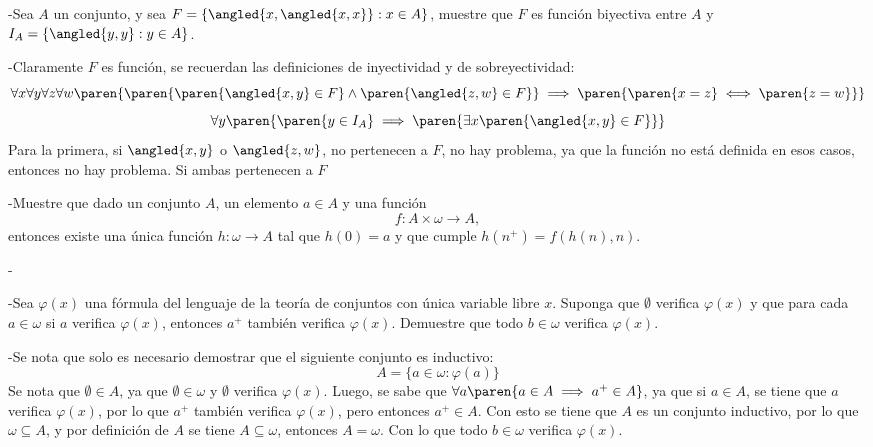 \begin{prob}
    -Sea \(A\) un conjunto, y sea \(F=\{\angled{x,\angled{x,x}}:x\in A\}\), muestre que \(F\) es función biyectiva entre \(A\) y \(I_A=\{\angled{y,y}:y\in A\}\).
\end{prob}

\begin{sol}
    -Claramente \(F\) es función, se recuerdan las definiciones de inyectividad y de sobreyectividad:
    \[
        \forall x\forall y\forall z\forall w\paren{\paren{\paren{\angled{x,y}\in F}\wedge\paren{\angled{z,w}\in F}}\implies\paren{\paren{x=z}\iff\paren{z=w}}}
    \]
    \[
        \forall y\paren{\paren{y\in I_A}\implies\paren{\exists x\paren{\angled{x,y}\in F}}}
    \]
    Para la primera, si \(\angled{x,y}\) o \(\angled{z,w}\), no pertenecen a \(F\), no hay problema, ya que la función no está definida en esos casos, entonces no hay problema. Si ambas pertenecen a \(F\) 
\end{sol}

\begin{prob}
    -Muestre que dado un conjunto \(A\), un elemento \(a\in A\) y una función
    \[
        f:A\times\omega\rightarrow A,
    \]
    entonces existe una única función \(h:\omega\rightarrow A\) tal que \(h(0)=a\) y que cumple \(h(n^+)=f(h(n),n)\).
\end{prob}

\begin{sol}
    -
\end{sol}

\begin{prob}[Bonus]
    -Sea \(\varphi(x)\) una fórmula del lenguaje de la teoría de conjuntos con única variable libre \(x\). Suponga que \(\emptyset\) verifica \(\varphi(x)\) y que para cada \(a\in\omega\) si \(a\) verifica \(\varphi(x)\), entonces \(a^+\) también verifica \(\varphi(x)\). Demuestre que todo \(b\in\omega\) verifica \(\varphi(x)\).
\end{prob}

\begin{sol}[Bonus]
    -Se nota que solo es necesario demostrar que el siguiente conjunto es inductivo:
    \[
        A=\{a\in\omega:\varphi(a)\}
    \]
    Se nota que \(\emptyset\in A\), ya que \(\emptyset\in\omega\) y \(\emptyset\) verifica \(\varphi(x)\). Luego, se sabe que \(\forall a\paren{a\in A\implies a^+\in A}\), ya que si \(a\in A\), se tiene que \(a\) verifica \(\varphi(x)\), por lo que \(a^+\) también verifica \(\varphi(x)\), pero entonces \(a^+\in A\). Con esto se tiene que \(A\) es un conjunto inductivo, por lo que \(\omega\subseteq A\), y por definición de \(A\) se tiene \(A\subseteq\omega\), entonces \(A=\omega\). Con lo que todo \(b\in\omega\) verifica \(\varphi(x)\).
\end{sol}

